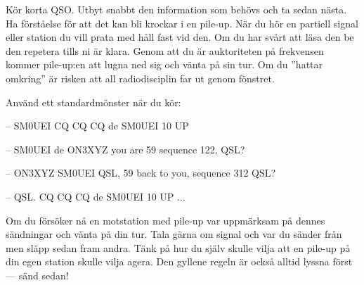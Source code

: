 Kör korta QSO. Utbyt snabbt den information som behövs och ta sedan nästa. Ha förståelse för att det kan bli krockar i en pile-up. När du hör en partiell signal eller station du vill prata med håll fast vid den. Om du har svårt att läsa den be den repetera tills ni är klara. Genom att du är auktoriteten på frekvensen kommer pile-up:en att lugna ned sig och vänta på sin tur. Om du ''hattar omkring'' är risken att all radiodisciplin far ut genom fönstret.

Använd ett standardmönster när du kör:

-- SM0UEI CQ CQ CQ de SM0UEI 10 UP

-- SM0UEI de ON3XYZ you are 59 sequence 122, QSL?

-- ON3XYZ SM0UEI QSL, 59 back to you, sequence 312 QSL?

-- QSL. CQ CQ CQ de SM0UEI 10 UP ...

Om du försöker nå en motstation med pile-up var uppmärksam på dennes sändningar och vänta på din tur. Tala gärna om signal och var du sänder från men släpp sedan fram andra. Tänk på hur du själv skulle vilja att en pile-up på din egen station skulle vilja agera. Den gyllene regeln är också alltid lyssna först --- sänd sedan!
